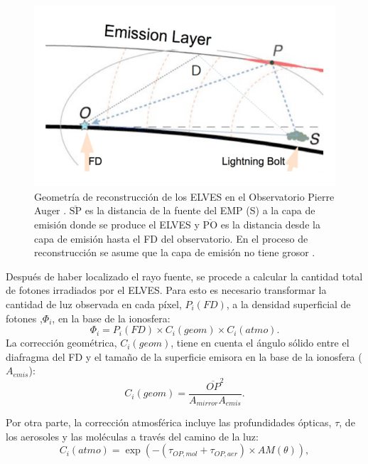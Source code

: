 \documentclass[11pt,oneside,openany,letter]{book}
\begin{document}
\begin{figure}
    \centering
    \includegraphics[scale=0.3]{figures/emission_layer.png}
    \caption[Geometr\'ia de reconstrucci\'on de los ELVES en el Observatorio Pierre Auger]{Geometr\'ia de reconstrucci\'on de los ELVES en el Observatorio Pierre Auger \cite{Mussa2019}. $\overline{\text{SP}}$ es la distancia de la fuente del EMP (S) a la capa de emisi\'on donde se produce el ELVES y $\overline{\text{PO}}$ es la distancia desde la capa de emisi\'on hasta el FD del observatorio. En el proceso de reconstrucci\'on se asume que la capa de emisi\'on no tiene grosor \cite{Mussa2019}.}
    \label{fig:emission_layer}
\end{figure}

Después de haber localizado el rayo fuente, se procede a calcular la cantidad total de fotones irradiados por el ELVES. Para esto es necesario transformar la cantidad de luz observada en cada píxel, $P_i(FD)$, a la densidad superficial de fotones ,$\Phi_i$, en la base de la ionosfera:
\begin{equation}
    \Phi_i=P_i(FD)\times C_i(geom)\times C_i(atmo).
\end{equation}
La corrección geométrica, $C_i(geom)$, tiene en cuenta el ángulo sólido entre el diafragma del FD y el tamaño de la superficie emisora en la base de la ionosfera ($A_{emis}$):
\begin{equation}
    C_i(geom)=\frac{\overline{OP}^{2}}{A_{mirror}A_{emis}}.
\end{equation}

Por otra parte, la corrección atmosférica incluye las profundidades ópticas, $\tau$, de los aerosoles y las moléculas a través del camino de la luz:
\begin{equation}
    C_i(atmo)= \exp\left(-(\tau_{OP, mol}+\tau_{OP, aer})\times AM(\theta)\right),
\end{equation}
\end{document}
